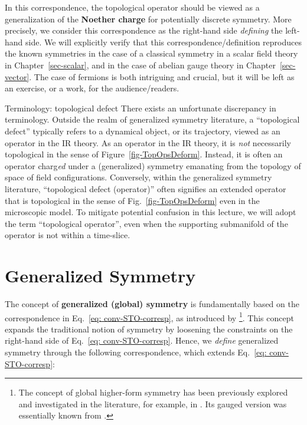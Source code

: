 \documentclass[11pt,toc=bibliography]{scrbook}
\numberwithin{equation}{section}
\begin{document}
In this correspondence, the topological operator should be viewed as a generalization of the \textbf{Noether charge} for potentially discrete symmetry. More precisely, we consider this correspondence as the right-hand side \emph{defining} the left-hand side. We will explicitly verify that this correspondence/definition reproduces the known symmetries in the case of a classical symmetry in a scalar field theory in Chapter~\ref{sec-scalar}, and in the case of abelian gauge theory in Chapter~\ref{sec-vector}. The case of fermions is both intriguing and crucial, but it will be left as an exercise, or a work, for the audience/readers.

\begin{warning}{Terminology: topological defect}
  There exists an unfortunate discrepancy in terminology. Outside the realm of generalized symmetry literature, a ``topological defect'' typically refers to a dynamical object, or its trajectory, viewed as an operator in the IR theory. As an operator in the IR theory, it is \emph{not} necessarily topological in the sense of Figure~\ref{fig-TopOpsDeform}. Instead, it is often an operator charg\emph{ed} under a (generalized) symmetry emanating from the topology of space of field configurations. Conversely, within the generalized symmetry literature, ``topological defect (operator)'' often signifies an extended operator that is  topological in the sense of Fig.~\ref{fig-TopOpsDeform} even in the microscopic model. To mitigate potential confusion in this lecture, we will adopt the term ``topological operator'', even when the supporting submanifold of the operator is not within a time-slice.
\end{warning}

\section{Generalized Symmetry}

The concept of \textbf{generalized (global) symmetry} is fundamentally
based on the correspondence in Eq.~\eqref{eq: conv-STO-corresp}, as
introduced by \cite{Gaiotto:2014kfa}\footnote{The concept of global
  higher-form symmetry has been previously explored and investigated in
  the literature, for example, in
  \cite{Kapustin:2013uxa,Barkeshli:2014cna}. Its gauged version was
  essentially known from \cite{KalbRamond}.}. This concept expands
the traditional notion of symmetry by loosening the constraints on the
right-hand side of Eq.~\eqref{eq: conv-STO-corresp}. Hence, we
\emph{define} generalized symmetry through the following correspondence,
which extends Eq.~\eqref{eq: conv-STO-corresp}:
\end{document}
